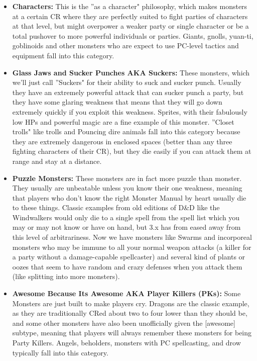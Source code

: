 \begin{itemize}\itemspace
   \item \textbf{Characters:} This is the ''as a character" philosophy, which makes monsters at a certain CR where they are perfectly suited to fight parties of characters at that level, but might overpower a weaker party or single character or be a total pushover to more powerful individuals or parties. Giants, gnolls, yuan-ti, goblinoids and other monsters who are expect to use PC-level tactics and equipment fall into this category.
   \item \textbf{Glass Jaws and Sucker Punches AKA Suckers:} These monsters, which we'll just call ''Suckers" for their ability to suck and sucker punch. Usually they have an extremely powerful attack that can sucker punch a party, but they have some glaring weakness that means that they will go down extremely quickly if you exploit this weakness. Sprites, with their fabulously low HPs and powerful magic are a fine example of this monster. ''Closet trolls" like trolls and Pouncing dire animals fall into this category because they are extremely dangerous in enclosed spaces (better than any three fighting characters of their CR), but they die easily if you can attack them at range and stay at a distance.
   \item \textbf{Puzzle Monsters:} These monsters are in fact more puzzle than monster. They usually are unbeatable unless you know their one weakness, meaning that players who don't know the right Monster Manual by heart usually die to these things. Classic examples from old editions of D\&D like the Windwalkers would only die to a single spell from the spell list which you may or may not know or have on hand, but 3.x has from eased away from this level of arbitrariness. Now we have monsters like Swarms and incorporeal monsters who may be immune to all your normal weapon attacks (a killer for a party without a damage-capable spellcaster) and several kind of plants or oozes that seem to have random and crazy defenses when you attack them (like splitting into more monsters).
   \item \textbf{Awesome Because Its Awesome AKA Player Killers (PKs):} Some Monsters are just built to make players cry. Dragons are the classic example, as they are traditionally CRed about two to four lower than they should be, and some other monsters have also been unofficially given the [awesome] subtype, meaning that players will always remember these monsters for being Party Killers. Angels, beholders, monsters with PC spellcasting, and drow typically fall into this category.
\end{itemize}


